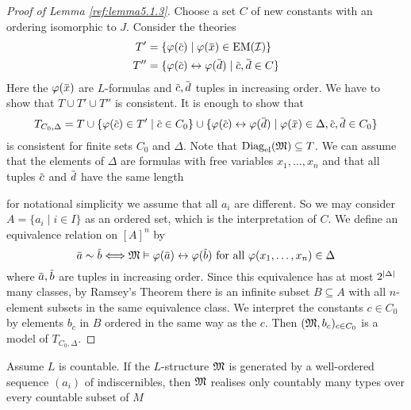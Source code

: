 \documentclass[11pt]{article}
\begin{document}
\begin{proof}[Proof of Lemma \ref{ref:lemma5.1.3}]
Choose a set \(C\) of new constants with an ordering isomorphic to \(J\). Consider the theories
\begin{align*}
T'&=\{\varphi(\barc)\mid\varphi(\barx)\in\EM(\cali)\}\\
T''&=\{\varphi(\barc)\leftrightarrow\varphi(\bard)\mid\barc,\bard\in C\}
\end{align*}
Here the \(\varphi(\barx)\) are \(L\)-formulas and \(\barc,\bard\) tuples in increasing order. We have
to show that \(T\cup T'\cup T''\) is consistent. It is enough to show that
\begin{equation*}
T_{C_0,\Delta}=T\cup\{\varphi(\barc)\in T'\mid\barc\in C_0\}\cup\{\varphi(\barc)\leftrightarrow\varphi(\bard)\mid\varphi(\barx)\in\Delta,\barc,\bard\in C_0\}
\end{equation*}
is consistent for finite sets \(C_0\) and \(\Delta\). Note that \(\operatorname{Diag}_{\operatorname{el}}(\mathfrak{M})\subseteq T\).
We can assume that the elements of \(\Delta\) are formulas
with free variables \(x_1,\dots,x_n\) and that all tuples \(\barc\) and \(\bard\) have the same
length

for notational simplicity we assume that all \(a_i\) are different. So we may
consider \(A=\{a_i\mid i\in I\}\) as an ordered set, which is the interpretation of \(C\). We define an
equivalence relation on \([A]^n\) by
\begin{equation*}
\bara\sim\barb\Longleftrightarrow\fM\vDash\varphi(\bara)\leftrightarrow\varphi(\barb)\text{ for all }\varphi(x_1,\dots,x_n)\in\Delta
\end{equation*}
where \(\bara,\barb\) are tuples in increasing order. Since this equivalence has at
most \(2^{\abs{\Delta}}\) many classes, by Ramsey's Theorem there is an infinite subset \(B\subseteq A\) with
all \(n\)-element subsets in the same equivalence class. We interpret the constants \(c\in C_0\)
by elements \(b_c\) in \(B\) ordered in the same way as the \(c\). Then \((\mathfrak{M},b_c)_{c\in C_0}\) is
a model of \(T_{C_0,\Delta}\).
\end{proof}

\begin{lemma}[]
\label{lemma5.1.6}
Assume \(L\) is countable. If the \(L\)-structure \(\mathfrak{M}\) is generated by a well-ordered
sequence \((a_i)\) of indiscernibles, then \(\mathfrak{M}\) realises only countably many types over every
countable subset of \(M\)
\end{lemma}
\end{document}
